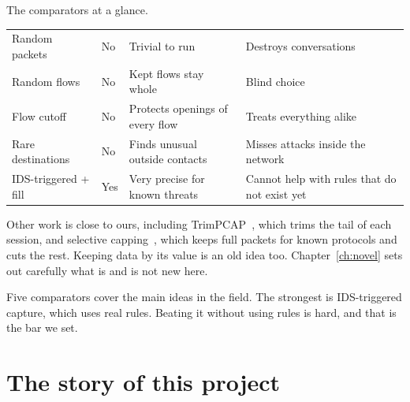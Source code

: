 \begin{gtable}{The comparators at a glance.}
\begin{tabularx}{\linewidth}{l l L L}
\toprule
{} &  &  & \\
\midrule
Random packets & No & Trivial to run & Destroys conversations\\
Random flows & No & Kept flows stay whole & Blind choice\\
Flow cutoff & No & Protects openings of every flow & Treats everything alike\\
Rare destinations & No & Finds unusual outside contacts & Misses attacks inside the network\\
IDS-triggered + fill & Yes & Very precise for known threats & Cannot help with rules that do not exist yet\\
\bottomrule
\end{tabularx}
\end{gtable}

\begin{honest}
Other work is close to ours, including TrimPCAP~\cite{trimpcap}, which trims the tail of each session, and selective capping~\cite{capping}, which keeps full packets for known protocols and cuts the rest. Keeping data by its value is an old idea too. Chapter~\ref{ch:novel} sets out carefully what is and is not new here.
\end{honest}

\begin{recap}
Five comparators cover the main ideas in the field. The strongest is IDS-triggered capture, which uses real rules. Beating it without using rules is hard, and that is the bar we set.
\end{recap}

\chapter{The story of this project}

